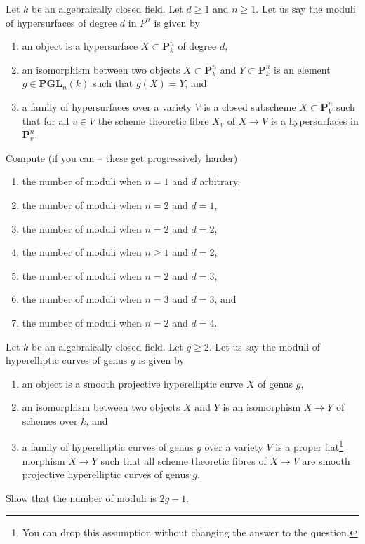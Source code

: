\begin{exercise}
\label{exercise-number-moduli-lines-conics}
Let $k$ be an algebraically closed field. Let $d \geq 1$ and $n \geq 1$.
Let us say the moduli of hypersurfaces of degree $d$ in $P^n$ is given by
\begin{enumerate}
\item an object is a hypersurface $X \subset \mathbf{P}^n_k$
of degree $d$,
\item an isomorphism between two objects $X \subset \mathbf{P}^n_k$
and $Y \subset \mathbf{P}^n_k$ is an element $g \in \mathbf{PGL}_n(k)$
such that $g(X) = Y$, and
\item a family of hypersurfaces over a variety $V$ is a closed
subscheme $X \subset \mathbf{P}^n_V$ such that for all $v \in V$
the scheme theoretic fibre $X_v$ of $X \to V$ is
a hypersurfaces in $\mathbf{P}^n_v$.
\end{enumerate}
Compute (if you can -- these get progressively harder)
\begin{enumerate}
\item the number of moduli when $n = 1$ and $d$ arbitrary,
\item the number of moduli when $n = 2$ and $d = 1$,
\item the number of moduli when $n = 2$ and $d = 2$,
\item the number of moduli when $n \geq 1$ and $d = 2$,
\item the number of moduli when $n = 2$ and $d = 3$,
\item the number of moduli when $n = 3$ and $d = 3$, and
\item the number of moduli when $n = 2$ and $d = 4$.
\end{enumerate}
\end{exercise}

\begin{exercise}
\label{exercise-number-moduli-hyperelliptic}
Let $k$ be an algebraically closed field. Let $g \geq 2$.
Let us say the moduli of hyperelliptic curves of genus $g$ is given by
\begin{enumerate}
\item an object is a smooth projective hyperelliptic curve $X$
of genus $g$,
\item an isomorphism between two objects $X$ and $Y$ is an
isomorphism $X \to Y$ of schemes over $k$, and
\item a family of hyperelliptic curves of genus $g$ over a variety $V$ is a
proper flat\footnote{You can drop this assumption without changing
the answer to the question.} morphism $X \to Y$ such that all scheme
theoretic fibres of $X \to V$ are smooth projective hyperelliptic curves
of genus $g$.
\end{enumerate}
Show that the number of moduli is $2g - 1$.
\end{exercise}





